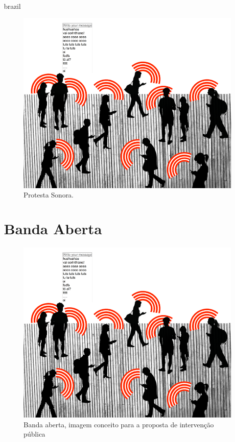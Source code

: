 \begin{otherlanguage*}{brazil}
\begin{figure}[htb]
    \caption{\label{protesta}Protesta Sonora. }
    \begin{center}
    \includegraphics[width=1\linewidth]{pictures/banda_aberta_mob_crowd.png}
    \end{center}
\end{figure}



\section{Banda Aberta}
\begin{figure}[htb]
    \caption{\label{bandaabertamob}Banda aberta, imagem conceito para a proposta de intervenção pública}
    \begin{center}
    \includegraphics[width=1\linewidth]{pictures/banda_aberta_mob_crowd.png}
    \end{center}
\end{figure}


\end{otherlanguage*}
